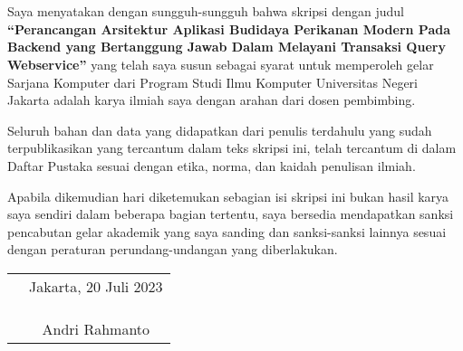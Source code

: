 \chapter*{}

Saya menyatakan dengan sungguh-sungguh bahwa skripsi dengan judul \textbf{“Perancangan Arsitektur Aplikasi Budidaya Perikanan Modern Pada Backend yang Bertanggung Jawab Dalam Melayani Transaksi Query Webservice”} yang telah saya susun sebagai syarat untuk memperoleh gelar Sarjana Komputer dari Program Studi Ilmu Komputer Universitas Negeri Jakarta adalah karya ilmiah saya dengan arahan dari dosen pembimbing.

Seluruh bahan dan data yang didapatkan dari penulis terdahulu yang sudah terpublikasikan yang tercantum dalam teks skripsi ini, telah tercantum di dalam Daftar Pustaka sesuai dengan etika, norma, dan kaidah penulisan ilmiah.

Apabila dikemudian hari diketemukan sebagian isi skripsi ini bukan hasil karya saya sendiri dalam beberapa bagian tertentu, saya bersedia mendapatkan sanksi pencabutan gelar akademik yang saya sanding dan sanksi-sanksi lainnya sesuai dengan peraturan perundang-undangan yang diberlakukan.

\vspace{4cm}

\begin{tabular}{p{7.5cm}c}
	&Jakarta, 20 Juli 2023\\
	&\\
	&\\
	&\\
	&Andri Rahmanto
\end{tabular}